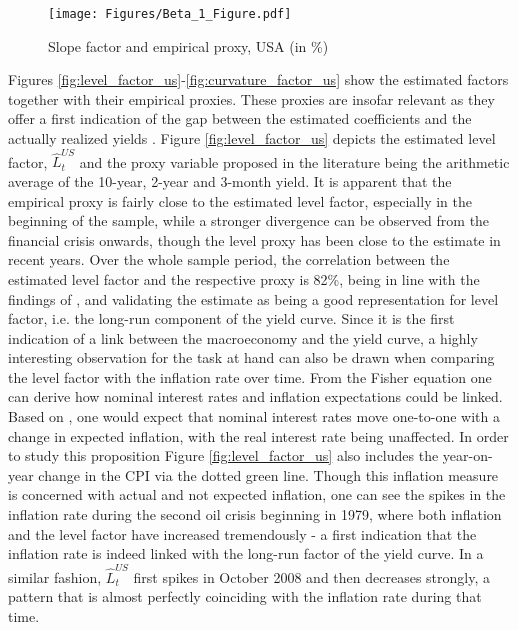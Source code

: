 \begin{figure}[!t]
    \centering
    \texttt{[image: Figures/Beta\_1\_Figure.pdf]}
    \caption{Slope factor and empirical proxy, USA (in \%)}
    \label{fig:slope_factor_us}
\end{figure}

Figures \ref{fig:level_factor_us}-\ref{fig:curvature_factor_us} show the estimated factors together with their empirical proxies. 
These proxies are insofar relevant as they offer a first indication of the gap between the estimated coefficients and the actually realized yields \citep{kanjilal2011macroeconomic}.
Figure \ref{fig:level_factor_us} depicts the estimated level factor, $\hat{L}^{US}_{t}$ and the proxy variable proposed in the literature being the arithmetic average of the 10-year, 2-year and 3-month yield. 
It is apparent that the empirical proxy is fairly close to the estimated level factor, especially in the beginning of the sample, while a stronger divergence can be observed from the financial crisis onwards, though the level proxy has been close to the estimate in recent years. 
Over the whole sample period, the correlation between the estimated level factor and the respective proxy is 82\%, being in line with the findings of \citet{rudebusch2008macro}, and validating the estimate as being a good representation for level factor, i.e. the long-run component of the yield curve. 
Since it is the first indication of a link between the macroeconomy and the yield curve, a highly interesting observation for the task at hand can also be drawn when comparing the level factor with the inflation rate over time. 
From the Fisher equation one can derive how nominal interest rates and inflation expectations could be linked. 
Based on \citet{fisher1930theory}, one would expect that nominal interest rates move one-to-one with a change in expected inflation, with the real interest rate being unaffected. 
In order to study this proposition Figure \ref{fig:level_factor_us} also includes the year-on-year change in the CPI via the dotted green line.
Though this inflation measure is concerned with actual and not expected inflation, one can see the spikes in the inflation rate during the second oil crisis beginning in 1979, where both inflation and the level factor have increased tremendously - a first indication that the inflation rate is indeed linked with the long-run factor of the yield curve. In a similar fashion, $\hat{L}^{US}_{t}$ first spikes in October 2008 and then decreases strongly, a pattern that is almost perfectly coinciding with the inflation rate during that time. 
